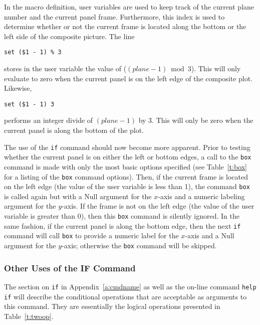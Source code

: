 In the macro definition, user variables are used
to keep track of the current plane number and the current panel frame.
Furthermore, this index is used to determine whether or not the current
frame is located along the bottom or the left side of the composite picture.
The line
\begin{wiplist}%
  \item [\wipd] {\tt set  (\$1 - 1) \% 3}
\end{wiplist}
stores in the user variable  the value of ($(plane - 1) \bmod 3$).
This will only evaluate to zero when the current panel is on the
left edge of the composite plot.
Likewise,
\begin{wiplist}%
  \item [\wipd] {\tt set  (\$1 - 1) \esc{\,} 3}
\end{wiplist}
performs an integer divide of $(plane - 1)$ by 3.
This will only be zero when the current panel is along the bottom of the plot.

The use of the {\tt if} command should now become more apparent.
Prior to testing whether the current panel is on either the left or
bottom edges, a call to the
{\tt box}
command is made with only the most basic options specified
(see Table~\ref{t:box} for a listing of the {\tt box} command options).
Then, if the current frame is located on the left edge
(\ie the value of the user variable  is less than 1),
the command {\tt box} is called again but with a {\sc Null} argument for
the $x$-axis and a numeric labeling argument for the $y$-axis.
If the frame is not on the left edge
(\ie the value of the user variable  is greater than 0),
then this {\tt box} command is silently ignored.
In the same fashion, if the current panel is along the bottom edge, then
the next {\tt if} command will call {\tt box} to provide a numeric
label for the $x$-axis and a {\sc Null} argument for the $y$-axis;
otherwise the {\tt box} command will be skipped.

\subsubsection*         {Other Uses of the IF Command}

The section on {\tt if} in Appendix~\ref{a:cmdname} as well as the
on-line command
{\tt help if}%
will describe the conditional operations that are acceptable as
arguments to this command.
They are essentially the logical operations presented in
Table~\ref{t:twoop}.

